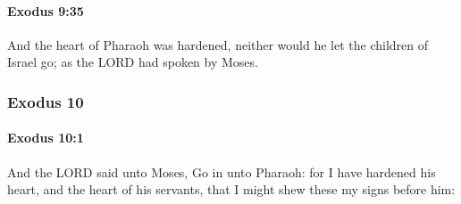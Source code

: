 		\paragraph{Exodus 9:35} %
			\label{EXODUS-9-35}

			And the heart of Pharaoh was hardened, neither would he let the children of Israel go; as the LORD had spoken by Moses.

	\subsubsection{Exodus 10} %
		\label{EXODUS-10}

		\paragraph{Exodus 10:1} %
			\label{EXODUS-10-1}

			And the LORD said unto Moses, Go in unto Pharaoh: for I have hardened his heart, and the heart of his servants, that I might shew these my signs before him:

